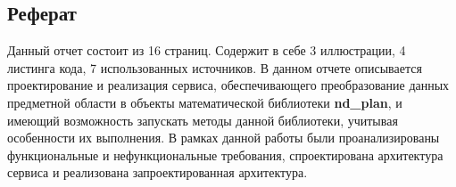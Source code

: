 \subsection*{\Large{Реферат}}
Данный отчет состоит из 16 страниц.
Содержит в себе 3 иллюстрации, 4 листинга кода, 7 использованных источников.
В данном отчете описывается проектирование и реализация сервиса, обеспечивающего
преобразование данных предметной области в объекты математической библиотеки \textbf{nd\_plan},
и имеющий возможность запускать методы данной библиотеки, учитывая особенности их выполнения.
В рамках данной работы были проанализированы функциональные и нефункциональные требования, спроектирована
архитектура сервиса и реализована запроектированная архитектура.
